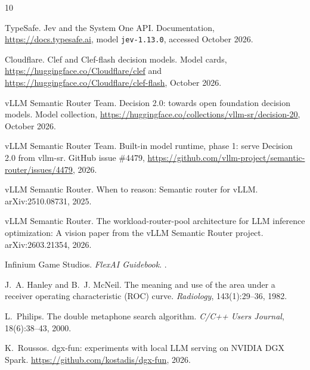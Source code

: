 \documentclass[11pt]{article}
\begin{document}

\begin{thebibliography}{10}

TypeSafe.
\newblock Jev and the System One API.
\newblock Documentation, \url{https://docs.typesafe.ai}, model \texttt{jev-1.13.0}, accessed October 2026.

Cloudflare.
\newblock Clef and Clef-flash decision models.
\newblock Model cards, \url{https://huggingface.co/Cloudflare/clef} and
  \url{https://huggingface.co/Cloudflare/clef-flash}, October 2026.

vLLM Semantic Router Team.
\newblock Decision 2.0: towards open foundation decision models.
\newblock Model collection, \url{https://huggingface.co/collections/vllm-sr/decision-20},
  October 2026.

vLLM Semantic Router Team.
\newblock Built-in model runtime, phase 1: serve Decision 2.0 from vllm-sr.
\newblock GitHub issue \#4479, \url{https://github.com/vllm-project/semantic-router/issues/4479}, 2026.

vLLM Semantic Router.
\newblock When to reason: Semantic router for vLLM.
\newblock arXiv:2510.08731, 2025.

vLLM Semantic Router.
\newblock The workload-router-pool architecture for LLM inference optimization: A vision paper from
  the vLLM Semantic Router project.
\newblock arXiv:2603.21354, 2026.

Infinium Game Studios.
\newblock \emph{FlexAI Guidebook}.
.

J.~A. Hanley and B.~J. McNeil.
\newblock The meaning and use of the area under a receiver operating characteristic (ROC) curve.
\newblock \emph{Radiology}, 143(1):29--36, 1982.

L.~Philips.
\newblock The double metaphone search algorithm.
\newblock \emph{C/C++ Users Journal}, 18(6):38--43, 2000.

K.~Roussos.
\newblock dgx-fun: experiments with local LLM serving on NVIDIA DGX Spark.
\newblock \url{https://github.com/kostadis/dgx-fun}, 2026.

\end{thebibliography}
\end{document}
